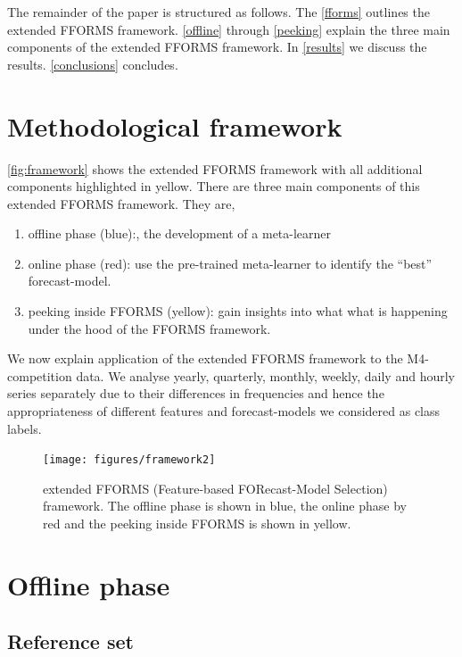 \documentclass[11pt,a4paper,]{article}
\providecommand{\tightlist}{%
  \setlength{\itemsep}{0pt}\setlength{\parskip}{0pt}}
\begin{document}
The remainder of the paper is structured as follows. The
\autoref{fforms} outlines the extended FFORMS framework.
\autoref{offline} through \autoref{peeking} explain the three main
components of the extended FFORMS framework. In \autoref{results} we
discuss the results. \autoref{conclusions} concludes.

\section{Methodological framework}\label{fforms}

\autoref{fig:framework} shows the extended FFORMS framework with all
additional components highlighted in yellow. There are three main
components of this extended FFORMS framework. They are,

\begin{enumerate}
\def\labelenumi{\arabic{enumi}.}
\tightlist
\item
  offline phase (blue):, the development of a meta-learner
\item
  online phase (red): use the pre-trained meta-learner to identify the
  ``best'' forecast-model.
\item
  peeking inside FFORMS (yellow): gain insights into what what is
  happening under the hood of the FFORMS framework.
\end{enumerate}

We now explain application of the extended FFORMS framework to the
M4-competition data. We analyse yearly, quarterly, monthly, weekly,
daily and hourly series separately due to their differences in
frequencies and hence the appropriateness of different features and
forecast-models we considered as class labels.

\begin{figure}[h]
\texttt{[image: figures/framework2]} \caption{extended FFORMS (Feature-based FORecast-Model Selection) framework. The offline phase is shown in blue, the online phase by red and the peeking inside FFORMS is shown in yellow.}\label{fig:framework}
\end{figure}

\section{Offline phase}\label{offline}

\subsection{Reference set}\label{reference-set}
\end{document}
